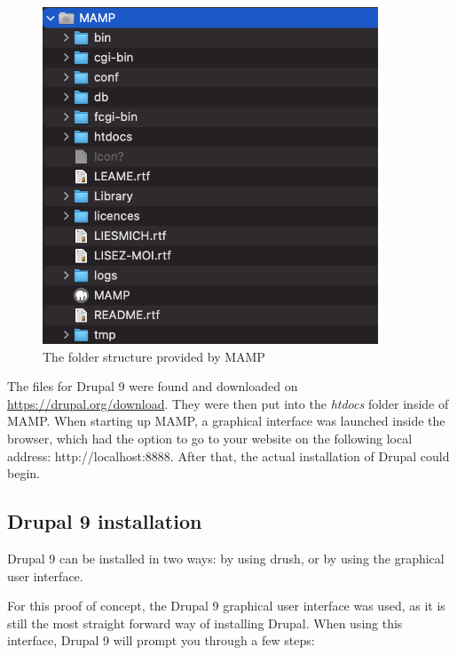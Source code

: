 \begin{figure}
	\centering
	\includegraphics[width=10cm]{./img/MAMP_Structure.png}
	\caption[MAMP folder structure]{The folder structure provided by MAMP}
	\label{fig:MAMP_Structure}
\end{figure}

The files for Drupal 9 were found and downloaded on \url{https://drupal.org/download}. They were then put into the \emph{htdocs} folder inside of MAMP. When starting up MAMP, a graphical interface was launched inside the browser, which had the option to go to your website on the following local address: http://localhost:8888. After that, the actual installation of Drupal could begin.

\subsection{Drupal 9 installation}

Drupal 9 can be installed in two ways: by using drush, or by using the graphical user interface. 

For this proof of concept, the Drupal 9 graphical user interface was used, as it is still the most straight forward way of installing Drupal. When using this interface, Drupal 9 will prompt you through a few steps:

